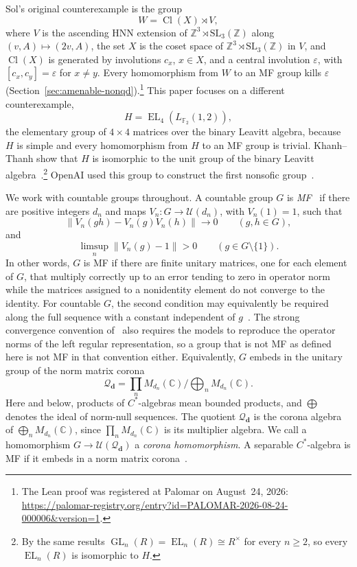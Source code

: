\documentclass[11pt]{amsart}
\theoremstyle{plain}
\newcommand{\F}{\mathbb F}
\newcommand{\C}{\mathbb C}
\newcommand{\GL}{\operatorname{GL}}
\newcommand{\EL}{\operatorname{EL}}
\newcommand{\U}{\mathcal U}
\newcommand{\opnorm}[1]{\left\lVert #1\right\rVert}
\begin{document}
Sol's original counterexample is the group
\[
 W=\operatorname{Cl}(X)\rtimes V,
\]
where $V$ is the ascending HNN extension of
$\mathbb Z^3\rtimes\mathrm{SL}_3(\mathbb Z)$ along
$(v,A)\mapsto(2v,A)$, the set $X$ is the coset space of
$\mathbb Z^3\rtimes\mathrm{SL}_3(\mathbb Z)$ in $V$, and
$\operatorname{Cl}(X)$ is generated by involutions $c_x$, $x\in X$,
and a central involution $\varepsilon$, with $[c_x,c_y]=\varepsilon$
for $x\ne y$.  Every homomorphism from $W$ to an MF group kills
$\varepsilon$ (Section~\ref{sec:amenable-nonqd}).\footnote{The
Lean proof was registered at Palomar on August~24, 2026:
\url{https://palomar-registry.org/entry?id=PALOMAR-2026-08-24-000006&version=1}.}
This paper focuses on a different counterexample,
\[
 H=\EL_4(L_{\F_2}(1,2)),
\]
the elementary group of $4\times4$ matrices over the binary Leavitt
algebra, because $H$ is simple and every homomorphism from $H$ to an
MF group is trivial.  Khanh--Thanh show that $H$ is isomorphic to the unit group of the
binary Leavitt algebra~\cite[Proposition~4.2 and
Corollary~4.4]{KhanhThanh}.\footnote{By the same results
$\GL_n(R)=\EL_n(R)\cong R^\times$ for every $n\ge2$, so every $\EL_n(R)$
is isomorphic to $H$.}  OpenAI used this group to construct the first nonsofic
group~\cite[Chapter~3]{OAI}.

We work with countable groups throughout.  A countable group $G$ is
\emph{MF}~\cite{CDE} if there are positive
integers $d_n$ and maps $V_n\colon G\to\U(d_n)$, with $V_n(1)=1$, such that
\[
 \opnorm{V_n(gh)-V_n(g)V_n(h)}\longrightarrow0
 \qquad(g,h\in G),
\]
and
\[
 \limsup_n\opnorm{V_n(g)-1}>0
 \qquad(g\in G\setminus\{1\}).
\]
In other words, $G$ is MF if there are finite unitary matrices, one for
each element of $G$, that multiply correctly up to an error tending to zero
in operator norm while the matrices assigned to a nonidentity element do
not converge to the identity.  For countable $G$, the second condition
may equivalently be required
along the full sequence with a constant independent of
$g$~\cite[Propositions~2 and~7]{Korchagin}.  The strong convergence
convention of~\cite{GaoEtAl,Schafhauser} also requires the models to
reproduce the operator norms of the left regular representation, so a group
that is not MF as defined here is not MF in that convention either.
Equivalently, $G$ embeds
in the unitary group of the norm matrix corona
\[
 \mathcal Q_{\mathbf d}
 =\prod_nM_{d_n}(\C)\big/\bigoplus_nM_{d_n}(\C).
\]
Here and below, products of $C^*$-algebras mean bounded products, and
$\bigoplus$ denotes the ideal of norm-null sequences.  The quotient
$\mathcal Q_{\mathbf d}$ is the corona algebra of $\bigoplus_nM_{d_n}(\C)$,
since $\prod_nM_{d_n}(\C)$ is its multiplier algebra.  We call a
homomorphism $G\to\U(\mathcal Q_{\mathbf d})$ a \emph{corona
homomorphism}.  A separable
$C^*$-algebra is MF if it embeds in a norm matrix corona~\cite{BK}.
\end{document}
